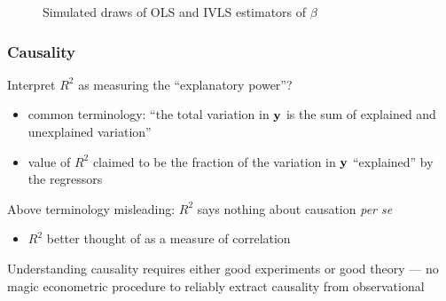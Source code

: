 \begin{frame}

    \begin{figure}
   \centering
   \caption{\label{f:iv_example} Simulated draws of OLS and IVLS estimators of $\beta$}
    \end{figure}

\end{frame}

\begin{frame}\frametitle{Causality}

    \vspace{2em}
    Interpret $R^2$  as measuring the ``explanatory power''?
    \begin{itemize}
        \item common terminology: ``the total variation in ${\mathbf y}$
        is the sum of explained and unexplained variation''
        \item value of $R^2$ claimed to be the fraction of the variation
                in ${\mathbf y}$ ``explained'' by the regressors
    \end{itemize}
    
    \vspace{.7em}
    Above terminology misleading: $R^2$ says nothing
    about causation \textit{per se}
    \begin{itemize}
        \item $R^2$ better thought of as a
    measure of correlation 
    \end{itemize}
    
    Understanding causality requires
    either good experiments or good theory --- no magic econometric
    procedure to reliably extract causality from observational


\end{frame}





